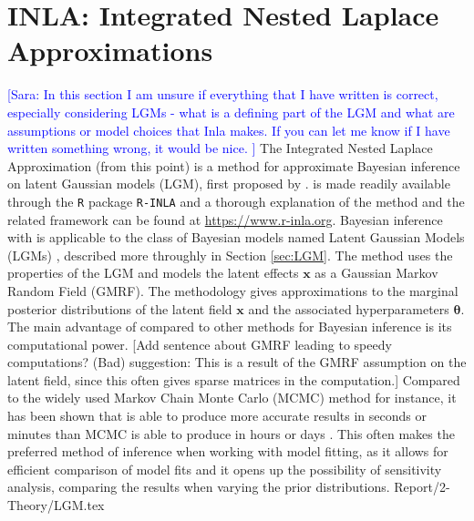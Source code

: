 \newpage
\section{INLA: Integrated Nested Laplace Approximations}
\textcolor{blue}{[Sara: In this section I am unsure if everything that I have written is correct, especially considering LGMs  - what is a defining part of the LGM and what are assumptions or model choices that Inla makes. If you can let me know if I have written something wrong, it would be nice. ]}
The Integrated Nested Laplace Approximation (\inla from this point) is a method for approximate Bayesian inference on latent Gaussian models (LGM), first proposed by \cite{rue2009inla}. \inla is made readily available through the \texttt{R} package \texttt{R-INLA} and a thorough explanation of the method and the related framework can be found at \url{https://www.r-inla.org}. 
Bayesian inference with \inla is applicable to the class of Bayesian models named Latent Gaussian Models (LGMs) \cite{rue2009inla}, described more throughly in Section \ref{sec:LGM}.  
\newline \newline
\noindent The \inla method uses the properties of the LGM and models the latent effects $\mathbf{x}$ as a Gaussian Markov Random Field (GMRF). The methodology gives approximations to the marginal posterior distributions of the latent field $\mathbf{x}$ and the associated hyperparameters $\boldsymbol{\theta}$. The main advantage of \inla compared to other methods for Bayesian inference is its computational power. [Add sentence about GMRF leading to speedy computations? (Bad) suggestion: This is a result of the GMRF assumption on the latent field, since this often gives sparse matrices in the computation.] Compared to the widely used Markov Chain Monte Carlo (MCMC) method for instance, it has been shown that \inla is able to produce more accurate results in seconds or minutes than MCMC is able to produce in hours or days \cite{rue2009inla}.
This often makes \inla the preferred method of inference when working with model fitting, as it allows for efficient comparison of model fits and it opens up the possibility of sensitivity analysis, comparing the results when varying the prior distributions. 
{Report/2-Theory/LGM.tex}

